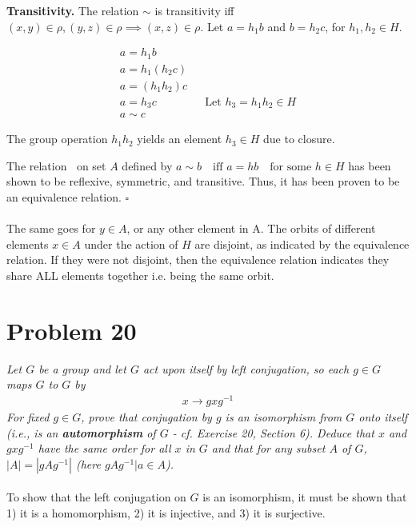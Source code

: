 \documentclass[12pt,letterpaper]{article}
\begin{document}
\textbf{Transitivity.} The relation $\sim$ is transitivity iff $(x,y) \in \rho, (y,z) \in \rho \implies (x,z) \in \rho$.
Let $a = h_1b$ and $b = h_2c$, for $h_1, h_2 \in H$.

\begin{equation}
   \begin{aligned}
      a = h_1b \\
      a = h_1(h_2c) \\
      a = (h_1 h_2)c \\
      a = h_3c && \text{Let } h_3 = h_1 h_2 \in H \\
      a \sim c
   \end{aligned}
\end{equation}

The group operation $h_1 h_2$ yields an element $h_3 \in H$ due to closure.

The relation $~$ on set $A$ defined by $a \sim b \quad \text{iff } a=hb \quad \text{for some } h \in H$
has been shown to be reflexive, symmetric, and transitive.
Thus, it has been proven to be an equivalence relation. $\square$ \\
\\
The same goes for $y \in A$, or any other element in A.
The orbits of different elements $x \in A$ under the action of $H$ are disjoint, as indicated by the equivalence relation.
If they were not disjoint, then the equivalence relation indicates they share ALL elements together 
i.e. being the same orbit.


\section{Problem 20}
\textit{Let $G$ be a group and let $G$ act upon itself by left conjugation, so each $g \in G$ maps $G$ to $G$ by \\
\begin{equation}
   \begin{aligned}
      x \to gxg^{-1}
   \end{aligned}
\end{equation}
For fixed $g \in G$, prove that conjugation by $g$ is an isomorphism from $G$ onto itself (i.e., is an \textbf{automorphism} of $G$
- cf. Exercise 20, Section 6).
Deduce that $x$ and $gxg^{-1}$ have the same order for all $x$ in $G$ and that for any subset $A$ of $G$, 
$|A| = |gAg^{-1}|$ (here $gAg^{-1} | a \in A$).} \\
\\
To show that the left conjugation on $G$ is an isomorphism, it must be shown that 1) it is a homomorphism, 2) it is injective, 
and 3) it is surjective.
\end{document}
